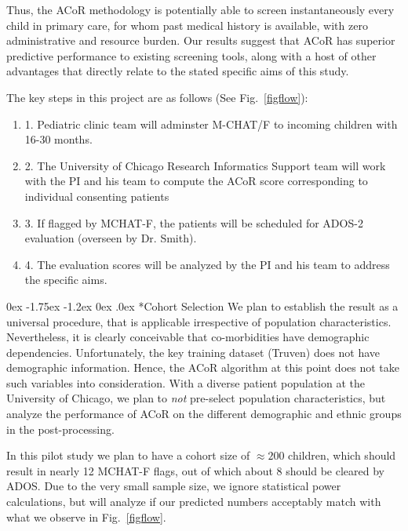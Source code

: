 \documentclass[onecolumn, compsoc,11pt]{IEEEtran}
\makeatletter
\renewcommand\subsection{\@startsection {subsection}{2}{\z@}%
                                   {0ex \@plus -1.75ex \@minus -1.2ex}%
                                   {0ex \@plus.0ex}%
                                   {\fontsize{11}{11}\selectfont\bfseries\sffamily\color{black}}}
\def\ZERO{ACoR\xspace}
\makeatother
\begin{document}
Thus, the \ZERO methodology is potentially able to screen instantaneously   every child  in primary care, for whom past medical history is available, with zero administrative and resource burden.
Our results suggest that \ZERO  has superior predictive performance to existing screening tools, along with a host of other advantages that directly relate to the stated specific aims of this study. 

The key steps in this project are as  follows (See Fig.~\ref{figflow}):

\begin{enumerate} 
[label=$\square$, leftmargin=0pt,
labelindent=0em, topsep=0.1em, labelsep=*, itemsep=.5em,itemindent=1em]
 \item 1. Pediatric clinic team  will  adminster  M-CHAT/F to incoming children with 16-30 months.
\item 2. The University of Chicago Research Informatics Support team will work with the PI and his team to
  compute the \ZERO score corresponding to individual consenting patients
\item 3. If flagged by MCHAT-F, the patients will be scheduled for ADOS-2 evaluation (overseen by Dr. Smith). 
\item 4. The evaluation scores will be analyzed by the PI and his  team to address the specific aims.
\end{enumerate}

\subsection*{Cohort Selection} We plan to establish the result as a universal procedure, that is applicable irrespective of population characteristics. Nevertheless, it is clearly conceivable that co-morbidities have demographic dependencies. Unfortunately, the key training dataset (Truven) does not have demographic information. Hence, the \ZERO algorithm at this point does not take such variables into consideration. With a diverse patient population at the University of Chicago, we plan to \textit{not} pre-select population characteristics, but analyze the performance of \ZERO on the different demographic and ethnic groups in the post-processing.

In this pilot study we plan to have a cohort size of $\approx 200$ children, which should result in nearly 12 MCHAT-F flags, out of which about 8 should be cleared by ADOS. Due to the very small  sample size, we ignore statistical power calculations, but  will analyze if our predicted numbers acceptably match with what we observe in Fig.~\ref{figflow}.
%
\end{document}
